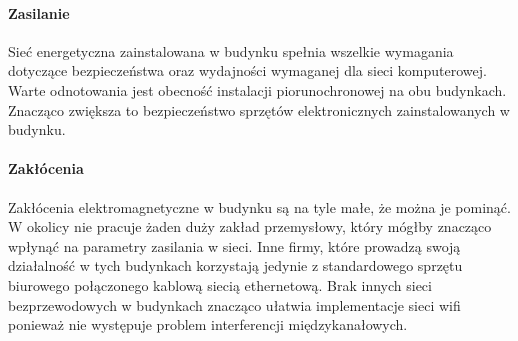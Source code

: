 \documentclass{report}
\begin{document}
\paragraph{Zasilanie}Sieć energetyczna zainstalowana w budynku spełnia wszelkie wymagania dotyczące bezpieczeństwa oraz wydajności wymaganej dla sieci komputerowej.
Warte odnotowania jest obecność instalacji piorunochronowej na obu budynkach. Znacząco zwiększa to bezpieczeństwo sprzętów elektronicznych zainstalowanych
w budynku.

\paragraph{Zakłócenia}Zakłócenia elektromagnetyczne w budynku są na tyle małe, że można je pominąć. W okolicy nie pracuje żaden duży zakład przemysłowy, który mógłby 
znacząco wpłynąć na parametry zasilania w sieci. Inne firmy, które prowadzą swoją działalność w tych budynkach korzystają jedynie z standardowego
sprzętu biurowego połączonego kablową siecią ethernetową. Brak innych sieci bezprzewodowych w budynkach znacząco ułatwia implementacje sieci wifi
ponieważ nie występuje problem interferencji międzykanałowych.
\end{document}
